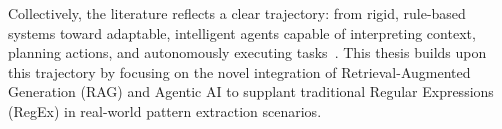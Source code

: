 Collectively, the literature reflects a clear trajectory: from rigid, rule-based systems toward adaptable, intelligent agents capable of interpreting context, planning actions, and autonomously executing tasks~\cite{lewis2020retrieval, ferrag2025can, muller2023taxonomy}. This thesis builds upon this trajectory by focusing on the novel integration of Retrieval-Augmented Generation (RAG) and Agentic AI to supplant traditional Regular Expressions (RegEx) in real-world pattern extraction scenarios.






































